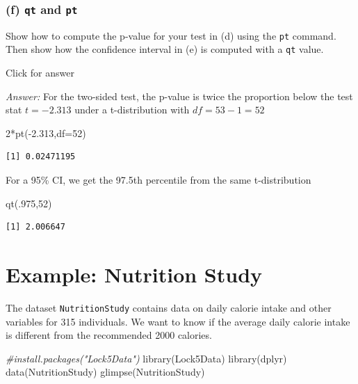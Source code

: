 \documentclass[
]{book}
\newenvironment{Shaded}{\begin{snugshade}}{\end{snugshade}}
\newcommand{\AttributeTok}[1]{\textcolor[rgb]{0.77,0.63,0.00}{#1}}
\newcommand{\CommentTok}[1]{\textcolor[rgb]{0.56,0.35,0.01}{\textit{#1}}}
\newcommand{\DecValTok}[1]{\textcolor[rgb]{0.00,0.00,0.81}{#1}}
\newcommand{\FloatTok}[1]{\textcolor[rgb]{0.00,0.00,0.81}{#1}}
\newcommand{\FunctionTok}[1]{\textcolor[rgb]{0.00,0.00,0.00}{#1}}
\newcommand{\NormalTok}[1]{#1}
\newcommand{\SpecialCharTok}[1]{\textcolor[rgb]{0.00,0.00,0.00}{#1}}
\begin{document}
\hypertarget{f-qt-and-pt}{%
\subsubsection{\texorpdfstring{(f) \texttt{qt} and \texttt{pt}}{(f) qt and pt}}\label{f-qt-and-pt}}

Show how to compute the p-value for your test in (d) using the \texttt{pt} command. Then show how the confidence interval in (e) is computed with a \texttt{qt} value.

Click for answer

\emph{Answer:} For the two-sided test, the p-value is twice the proportion below the test stat \(t=-2.313\) under a t-distribution with \(df=53-1=52\)

\begin{Shaded}
\begin{Highlighting}[]
\DecValTok{2}\SpecialCharTok{*}\FunctionTok{pt}\NormalTok{(}\SpecialCharTok{{-}}\FloatTok{2.313}\NormalTok{,}\AttributeTok{df=}\DecValTok{52}\NormalTok{)}
\end{Highlighting}
\end{Shaded}

\begin{verbatim}
[1] 0.02471195
\end{verbatim}

For a 95\% CI, we get the 97.5th percentile from the same t-distribution

\begin{Shaded}
\begin{Highlighting}[]
\FunctionTok{qt}\NormalTok{(.}\DecValTok{975}\NormalTok{,}\DecValTok{52}\NormalTok{)}
\end{Highlighting}
\end{Shaded}

\begin{verbatim}
[1] 2.006647
\end{verbatim}

\hypertarget{example-nutrition-study}{%
\section{Example: Nutrition Study}\label{example-nutrition-study}}

The dataset \texttt{NutritionStudy} contains data on daily calorie intake and other variables for 315 individuals. We want to know if the average daily calorie intake is different from the recommended 2000 calories.

\begin{Shaded}
\begin{Highlighting}[]
\CommentTok{\#install.packages("Lock5Data")}
\FunctionTok{library}\NormalTok{(Lock5Data)}
\FunctionTok{library}\NormalTok{(dplyr)}
\FunctionTok{data}\NormalTok{(NutritionStudy)}
\FunctionTok{glimpse}\NormalTok{(NutritionStudy)}
\end{Highlighting}
\end{Shaded}
\end{document}
